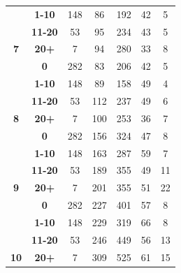 \documentclass[sigconf,review]{acmart}
\begin{document}
\begin{table}
{\begin{tabular}{|c@{~}|c@{~}|c@{~}|c@{~}|c@{~}|c@{~}|c|}
 & \textbf{1-10} & 148 & \cellcolor[HTML]{C0C0C0}86 & \cellcolor[HTML]{C0C0C0}192 & \cellcolor[HTML]{C0C0C0}42 & \cellcolor[HTML]{C0C0C0}5 \\ \cline{2-7} 
 & \textbf{11-20} & 53 & \cellcolor[HTML]{C0C0C0}95 & 234 & \cellcolor[HTML]{C0C0C0}43 & \cellcolor[HTML]{C0C0C0}5 \\ \cline{2-7} 
\multirow{-4}{*}{\textbf{7}} & \textbf{20+} & 7 & \cellcolor[HTML]{C0C0C0}94 & 280 & \cellcolor[HTML]{C0C0C0}33 & \cellcolor[HTML]{C0C0C0}8 \\ \hline
 & \textbf{0} & 282 & \cellcolor[HTML]{C0C0C0}83 & 206 & 42 & \cellcolor[HTML]{C0C0C0}5 \\ \cline{2-7} 
 & \textbf{1-10} & 148 & \cellcolor[HTML]{C0C0C0}89 & \cellcolor[HTML]{C0C0C0}158 & \cellcolor[HTML]{C0C0C0}49 & \cellcolor[HTML]{C0C0C0}4 \\ \cline{2-7} 
 & \textbf{11-20} & 53 & 112 & 237 & \cellcolor[HTML]{C0C0C0}49 & 6 \\ \cline{2-7} 
\multirow{-4}{*}{\textbf{8}} & \textbf{20+} & 7 & \cellcolor[HTML]{C0C0C0}100 & 253 & 36 & 7 \\ \hline
 & \textbf{0} & 282 & \cellcolor[HTML]{C0C0C0}156 & 324 & 47 & \cellcolor[HTML]{C0C0C0}8 \\ \cline{2-7} 
 & \textbf{1-10} & 148 & \cellcolor[HTML]{C0C0C0}163 & \cellcolor[HTML]{C0C0C0}287 & \cellcolor[HTML]{C0C0C0}59 & \cellcolor[HTML]{C0C0C0}7 \\ \cline{2-7} 
 & \textbf{11-20} & 53 & \cellcolor[HTML]{C0C0C0}189 & 355 & \cellcolor[HTML]{C0C0C0}49 & 11 \\ \cline{2-7} 
\multirow{-4}{*}{\textbf{9}} & \textbf{20+} & 7 & \cellcolor[HTML]{C0C0C0}201 & 355 & \cellcolor[HTML]{C0C0C0}51 & 22 \\ \hline
 & \textbf{0} & 282 & \cellcolor[HTML]{C0C0C0}227 & 401 & \cellcolor[HTML]{C0C0C0}57 & \cellcolor[HTML]{C0C0C0}8 \\ \cline{2-7} 
 & \textbf{1-10} & 148 & \cellcolor[HTML]{C0C0C0}229 & \cellcolor[HTML]{C0C0C0}319 & \cellcolor[HTML]{C0C0C0}66 & \cellcolor[HTML]{C0C0C0}8 \\ \cline{2-7} 
 & \textbf{11-20} & 53 & \cellcolor[HTML]{C0C0C0}246 & 449 & \cellcolor[HTML]{C0C0C0}56 & 13 \\ \cline{2-7} 
\multirow{-4}{*}{\textbf{10}} & \textbf{20+} & 7 & \cellcolor[HTML]{C0C0C0}309 & 525 & \cellcolor[HTML]{C0C0C0}61 & 15 \\ \hline

\end{tabular}}
\end{table}
\end{document}
